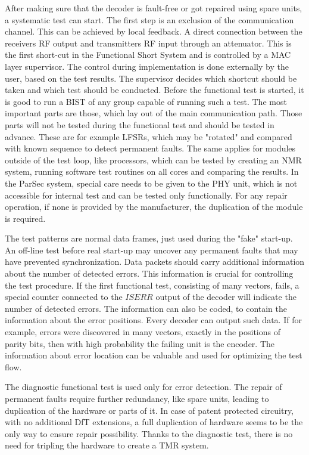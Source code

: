 After making sure that the decoder is fault-free or got repaired using spare units, a systematic test can start. The first step is an exclusion of the communication channel. This can be achieved by local feedback. A direct connection between the receivers RF output and transmitters RF input through an attenuator. This is the first short-cut in the Functional Short System and is controlled by a MAC layer supervisor. The control during implementation is done externally by the user, based on the test results. The supervisor decides which shortcut should be taken and which test should be conducted. Before the functional test is started, it is good to run a BIST of any group capable of running such a test. The most important parts are those, which lay out of the main communication path. Those parts will not be tested during the functional test and should be tested in advance. These are for example LFSRs, which may be "rotated" and compared with known sequence to detect permanent faults. The same applies for modules outside of the test loop, like processors, which can be tested by creating an NMR system, running software test routines on all cores and comparing the results. In the ParSec system, special care needs to be given to the PHY unit, which is not accessible for internal test and can be tested only functionally. For any repair operation, if none is provided by the manufacturer, the duplication of the module is required. 

The test patterns are normal data frames, just used during the "fake" start-up. An off-line test before real start-up may uncover any permanent faults that may have prevented synchronization. Data packets should carry additional information about the number of detected errors. This information is crucial for controlling the test procedure. If the first functional test, consisting of many vectors, fails, a special counter connected to the $ISERR$ output of the decoder will indicate the number of detected errors. The information can also be coded, to contain the information about the error positions. Every decoder can output such data. If for example, errors were discovered in many vectors, exactly in the positions of parity bits, then with high probability the failing unit is the encoder. The information about error location can be valuable and used for optimizing the test flow.

The diagnostic functional test is used only for error detection. The repair of permanent faults require further redundancy, like spare units, leading to duplication of the hardware or parts of it. In case of patent protected circuitry, with no additional DfT extensions, a full duplication of hardware seems to be the only way to ensure repair possibility. Thanks to the diagnostic test, there is no need for tripling the hardware to create a TMR system.

